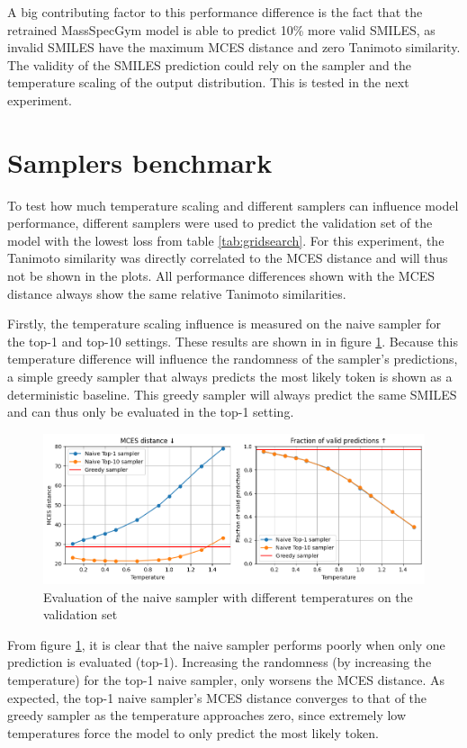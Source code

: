 A big contributing factor to this performance difference is the fact that the retrained MassSpecGym model is able to predict 10\% more valid SMILES, as invalid SMILES have the maximum MCES distance and zero Tanimoto similarity.
The validity of the SMILES prediction could rely on the sampler and the temperature scaling of the output distribution. This is tested in the next experiment.


\section{Samplers benchmark}

To test how much temperature scaling and different samplers can influence model performance, different samplers were used to predict the validation set of the model with the lowest loss from table \ref{tab:gridsearch}.
For this experiment, the Tanimoto similarity was directly correlated to the MCES distance and will thus not be shown in the plots.
All performance differences shown with the MCES distance always show the same relative Tanimoto similarities.

Firstly, the temperature scaling influence is measured on the naive sampler for the top-1 and top-10 settings.
These results are shown in in figure \ref{fig:naive_and_greedy}.
Because this temperature difference will influence the randomness of the sampler's predictions, a simple greedy sampler that always predicts the most likely token is shown as a deterministic baseline.
This greedy sampler will always predict the same SMILES and can thus only be evaluated in the top-1 setting.

\begin{figure}[h]
    \centering
    \includegraphics[width=1.0\textwidth]{figures/results/samplers/naive_and_greedy.png}
    \caption{Evaluation of the naive sampler with different temperatures on the validation set}
    \label{fig:naive_and_greedy}
\end{figure}

From figure \ref{fig:naive_and_greedy}, it is clear that the naive sampler performs poorly when only one prediction is evaluated (top-1).
Increasing the randomness (by increasing the temperature) for the top-1 naive sampler, only worsens the MCES distance.
As expected, the top-1 naive sampler's MCES distance converges to that of the greedy sampler as the temperature approaches zero, since extremely low temperatures force the model to only predict the most likely token.

